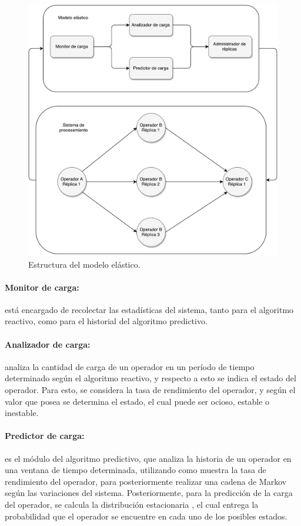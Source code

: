 \begin{figure}[ht!]
  \centering
    \includegraphics[scale=0.5]{images/Diagrama.pdf}
  \caption{Estructura del modelo elástico.}
  \label{fig:componentesSistemas}
\end{figure}

\paragraph{Monitor de carga:} está encargado de recolectar las estadísticas del sistema, tanto para el algoritmo reactivo, como para el historial del algoritmo predictivo.

\paragraph{Analizador de carga:} analiza la cantidad de carga de un operador en un período de tiempo determinado según el algoritmo reactivo, y respecto a esto se indica el estado del operador. Para esto, se considera la tasa de rendimiento del operador, y según el valor que posea se determina el estado, el cual puede ser ocioso, estable o inestable.

\paragraph{Predictor de carga:} es el módulo del algoritmo predictivo, que analiza la historia de un operador en una ventana de tiempo determinada, utilizando como muestra la tasa de rendimiento del operador, para posteriormente realizar una cadena de Markov según las variaciones del sistema. Posteriormente, para la predicción de la carga del operador, se calcula la distribución estacionaria \citep{Papoulis1984}, el cual entrega la probabilidad que el operador se encuentre en cada uno de los posibles estados.


